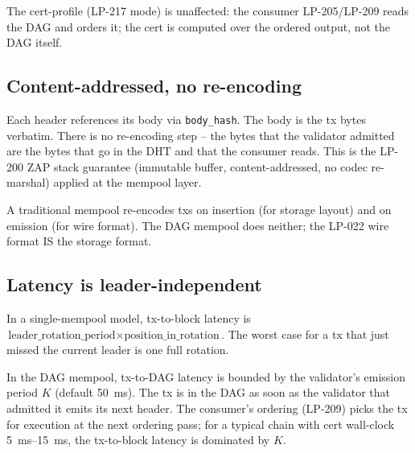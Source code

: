 The cert-profile (LP-217 mode) is unaffected: the consumer
LP-205/LP-209 reads the DAG and orders it; the cert is computed over
the ordered output, not the DAG itself.

\subsection{Content-addressed, no re-encoding}

Each header references its body via \texttt{body\_hash}. The body is
the tx bytes verbatim. There is no re-encoding step -- the bytes
that the validator admitted are the bytes that go in the DHT and
that the consumer reads. This is the LP-200 ZAP stack guarantee
(immutable buffer, content-addressed, no codec re-marshal) applied
at the mempool layer.

A traditional mempool re-encodes txs on insertion (for storage
layout) and on emission (for wire format). The DAG mempool does
neither; the LP-022 wire format IS the storage format.

\subsection{Latency is leader-independent}

In a single-mempool model, tx-to-block latency is
$\textrm{leader\_rotation\_period} \times \textrm{position\_in\_rotation}$.
The worst case for a tx that just missed the current leader is one
full rotation.

In the DAG mempool, tx-to-DAG latency is bounded by the validator's
emission period $K$ (default \SI{50}{\milli\second}). The tx is in
the DAG as soon as the validator that admitted it emits its next
header. The consumer's ordering (LP-209) picks the tx for execution
at the next ordering pass; for a typical chain with cert wall-clock
\SI{5}{\milli\second}--\SI{15}{\milli\second}, the tx-to-block
latency is dominated by $K$.
